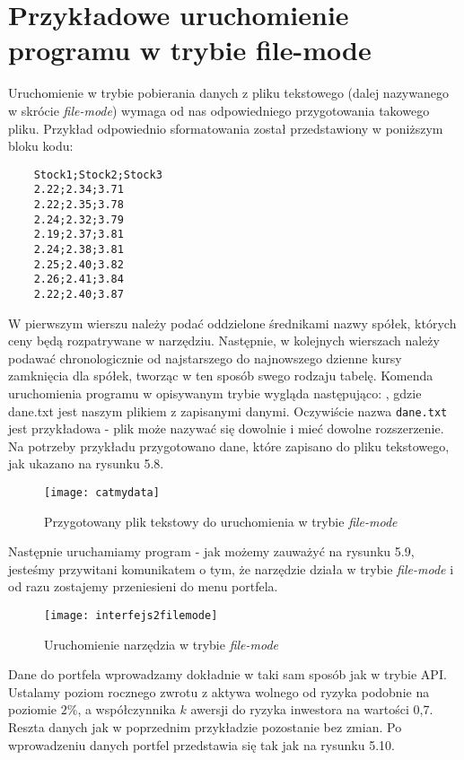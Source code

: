 \documentclass[magister]{dyplom}
\def\code#1{\texttt{#1}}
\begin{document}
\section{Przykładowe uruchomienie programu w trybie file-mode}

Uruchomienie w trybie pobierania danych z pliku tekstowego (dalej nazywanego w skrócie \textit{file-mode}) wymaga od nas odpowiedniego przygotowania takowego pliku. Przykład odpowiednio sformatowania został przedstawiony w poniższym bloku kodu:\newpage
\begin{verbatim}
	Stock1;Stock2;Stock3
	2.22;2.34;3.71
	2.22;2.35;3.78
	2.24;2.32;3.79
	2.19;2.37;3.81
	2.24;2.38;3.81
	2.25;2.40;3.82
	2.26;2.41;3.84
	2.22;2.40;3.87
\end{verbatim}
W pierwszym wierszu należy podać oddzielone średnikami nazwy spółek, których ceny będą rozpatrywane w narzędziu. Następnie, w kolejnych wierszach należy podawać chronologicznie od najstarszego do najnowszego dzienne kursy zamknięcia dla spółek, tworząc w ten sposób swego rodzaju tabelę. Komenda uruchomienia programu w opisywanym trybie wygląda następująco:
,
gdzie dane.txt jest naszym plikiem z zapisanymi danymi. Oczywiście nazwa \code{dane.txt} jest przykładowa - plik może nazywać się dowolnie i mieć dowolne rozszerzenie.
Na potrzeby przykładu przygotowano dane, które zapisano do pliku tekstowego, jak ukazano na rysunku 5.8. 

\begin{figure}[ht]
	\centering
	\texttt{[image: catmydata]}
	\caption{Przygotowany plik tekstowy do uruchomienia w trybie \textit{file-mode}}
\end{figure}

Następnie uruchamiamy program - jak możemy zauważyć na rysunku 5.9, jesteśmy przywitani komunikatem o tym, że narzędzie działa w trybie \textit{file-mode} i od razu zostajemy przeniesieni do menu portfela.

\begin{figure}[ht]
	\centering
	\texttt{[image: interfejs2filemode]}
	\caption{Uruchomienie narzędzia w trybie \textit{file-mode}}
\end{figure}

\newpage
Dane do portfela wprowadzamy dokładnie w taki sam sposób jak w trybie API. Ustalamy poziom rocznego zwrotu z aktywa wolnego od ryzyka podobnie na poziomie $2 \%$, a współczynnika $k$ awersji do ryzyka inwestora na wartości 0,7. Reszta danych jak w poprzednim przykładzie pozostanie bez zmian. Po wprowadzeniu danych portfel przedstawia się tak jak na rysunku 5.10.
\end{document}
